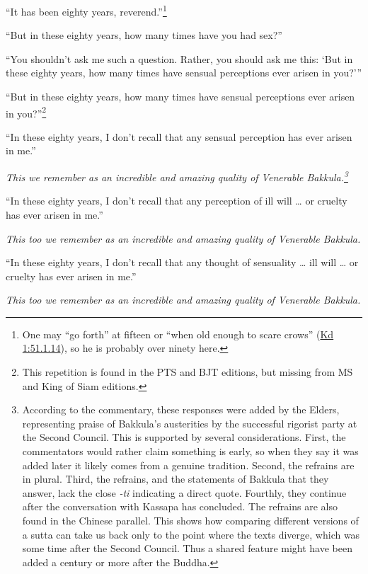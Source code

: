 \documentclass[12pt,openany]{book}%
\begin{document}
“It has been eighty years, reverend.”\footnote{One may “go forth” at fifteen or “when old enough to scare crows” (\href{https://suttacentral.net/pli-tv-kd1/en/sujato\#51.1.14}{Kd 1:51.1.14}), so he is probably over ninety here. } 

“But in these eighty years, how many times have you had sex?” 

“You shouldn’t ask me such a question. Rather, you should ask me this: ‘But in these eighty years, how many times have sensual perceptions ever arisen in you?’” 

“But in these eighty years, how many times have sensual perceptions ever arisen in you?”\footnote{This repetition is found in the PTS and BJT editions, but missing from MS and King of Siam editions. } 

“In these eighty years, I don’t recall that any sensual perception has ever arisen in me.” 

\textit{This we remember as an incredible and amazing quality of Venerable Bakkula.\footnote{According to the commentary, these responses were added by the Elders, representing praise of Bakkula’s austerities by the successful rigorist party at the Second Council. This is supported by several considerations. First, the commentators would rather claim something is early, so when they say it was added later it likely comes from a genuine tradition. Second, the refrains are in plural. Third, the refrains, and the statements of Bakkula that they answer, lack the close \textit{-ti} indicating a direct quote. Fourthly, they continue after the conversation with Kassapa has concluded. The refrains are also found in the Chinese parallel. This shows how comparing different versions of a sutta can take us back only to the point where the texts diverge, which was some time after the Second Council. Thus a shared feature might have been added a century or more after the Buddha. } }

“In these eighty years, I don’t recall that any perception of ill will … or cruelty has ever arisen in me.” 

\textit{This too we remember as an incredible and amazing quality of Venerable Bakkula. }

“In these eighty years, I don’t recall that any thought of sensuality … ill will … or cruelty has ever arisen in me.” 

\textit{This too we remember as an incredible and amazing quality of Venerable Bakkula. }
\end{document}
